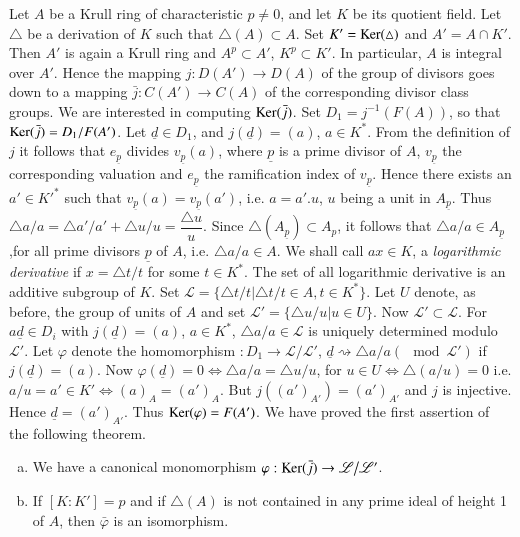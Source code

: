  Let $A$ be a Krull ring of characteristic $p \neq 0$, and let $K$ be
 its quotient field. Let $\triangle$ be a derivation of $K$ such that
 $\triangle (A) \subset A$. Set $K' = \operatorname{Ker} (\triangle)$ and $A' = A
 \cap K'$. Then $A'$ is again  a Krull ring and $A^p \subset A'$, $K^p
 \subset K'$. In particular, $A$ is integral over $A'$. Hence the
 mapping $j : D(A') \to D(A)$ of the group of divisors goes down to a
 mapping $\bar{j} : C(A') \to C(A)$ of the corresponding divisor class
 groups. We are interested in computing $\operatorname{Ker} (\bar{j})$. Set $D_1 =
 j^{-1} (F(A))$, so that $\operatorname{Ker} (\bar{j}) = D_1 / F(A')$. Let
 $\underline{d} \in D_1$, and $ j(\underline{d}) = (a)$, $a \in
 K^*$. From the definition of $j$ it follows that $e_{\underline{p}}$
 divides $v_{\underline{p}}(a)$, where $\underline{p}$ is a prime
 divisor of $A$, $v_{\underline{p}}$ the corresponding valuation and
 $e_{\underline{p}}$ the  ramification index of
 $v_{\underline{p}}$. Hence there exists an $a' \in K'^*$ such that
 $v_{\underline{p}}(a) = v_{\underline{p}} (a')$, i.e. $a = a' . u$,
 $u$ being a unit in $A_{\underline{p}}$. Thus $\triangle a/a =
 \triangle a'/a' + \triangle u/u = \dfrac{\triangle u}{u}$. Since
 $\triangle (A_{\underline{p}}) \subset A_p$, it follows that $\triangle
 a/a \in A_{\underline{p}}$,\pageoriginale for all prime divisors
 $\underline{p}$ of 
 $A$, i.e. $\triangle a/a \in A$. We shall call $a x \in K$, a
 \textit{logarithmic derivative} if $x = \triangle t/t $ for some $t
 \in K^*$. The set of all logarithmic derivative is an additive
 subgroup of $K$. Set $\mathscr{L} = \big\{\triangle t/t \big |
 \triangle t / t \in A,  t \in K^{\ast} \big\}$. Let $U$ denote, as before,
 the group of units of $A$ and set $\mathscr{L}' = \big\{\triangle u/
 u \big| u \in U \big\}$. Now $\mathscr{L} ' \subset
 \mathscr{L}$. For $a \underline{d} \in D_i$ with $j (\underline{d}) =
 (a)$, $a \in K^*$, $\triangle a/a \in \mathscr{L}$ is uniquely determined
 modulo $\mathscr{L}'$. Let $\varphi$ denote the homomorphism  $: D_1
 \to \mathscr{L}/ \mathscr{L}'$, $\underline{d} \rightsquigarrow
 \triangle a/a(\mod \mathscr{L}')$ if $j (\underline{d}) = (a)$. Now $\varphi
 (\underline{d}) = 0 \Leftrightarrow \triangle a/a = \triangle u/ u$,
 for $u \in U \Leftrightarrow \triangle (a/ u) = 0$ i.e. $a / u = a'
 \in K' \Leftrightarrow (a)_A = (a')_A$. But $j ((a')_{A'}) =
 (a')_{A'}$ and $j $ is injective. Hence $\underline{d} = (a')_{A'}
 $. Thus $\operatorname{Ker} (\varphi) = F(A')$. We have proved the first assertion
 of the following theorem. 
 
\begin{theorem}\label{chap3:thm2.1}%
\begin{enumerate}[(a)]
\item We have a canonical monomorphism $\varphi : \operatorname{Ker} (\bar{j})
  \to \mathscr{L} \big / \mathscr{L}'$. 

\item If $[K : K'] = p$ and if $\triangle (A)$ is not contained
  in any prime ideal of height 1 of $A$, then $\bar{\varphi} $ is an
  isomorphism. 
\end{enumerate}
\end{theorem}
       
